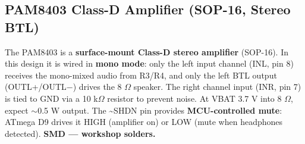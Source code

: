 \documentclass[a4paper,11pt]{article}
\renewcommand*{\,}{ }%
\begin{document}
\subsection{PAM8403 Class-D Amplifier (SOP-16, Stereo BTL)}

The PAM8403 is a \textbf{surface-mount Class-D stereo amplifier} (SOP-16). In this design it is wired in \textbf{mono mode}: only the left input channel (INL, pin 8) receives the mono-mixed audio from R3/R4, and only the left BTL output (OUTL+/OUTL$-$) drives the 8\,$\Omega$ speaker. The right channel input (INR, pin 7) is tied to GND via a 10\,k$\Omega$ resistor to prevent noise. At VBAT 3.7\,V into 8\,$\Omega$, expect $\sim$0.5\,W output. The \textasciitilde{}SHDN pin provides \textbf{MCU-controlled mute}: ATmega D9 drives it HIGH (amplifier on) or LOW (mute when headphones detected). \textbf{SMD --- workshop solders.}
\end{document}
